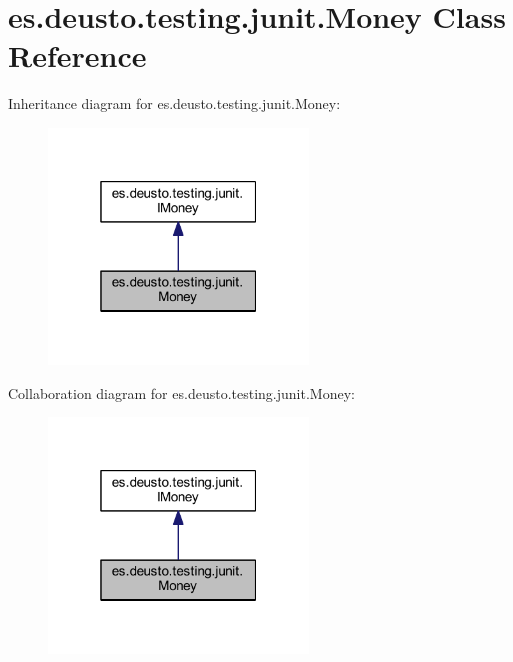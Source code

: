 \hypertarget{classes_1_1deusto_1_1testing_1_1junit_1_1_money}{}\section{es.\+deusto.\+testing.\+junit.\+Money Class Reference}
\label{classes_1_1deusto_1_1testing_1_1junit_1_1_money}


Inheritance diagram for es.\+deusto.\+testing.\+junit.\+Money\+:
\nopagebreak
\begin{figure}[H]
\begin{center}
\leavevmode
\includegraphics[width=196pt]{classes_1_1deusto_1_1testing_1_1junit_1_1_money__inherit__graph}
\end{center}
\end{figure}


Collaboration diagram for es.\+deusto.\+testing.\+junit.\+Money\+:
\nopagebreak
\begin{figure}[H]
\begin{center}
\leavevmode
\includegraphics[width=196pt]{classes_1_1deusto_1_1testing_1_1junit_1_1_money__coll__graph}
\end{center}
\end{figure}
